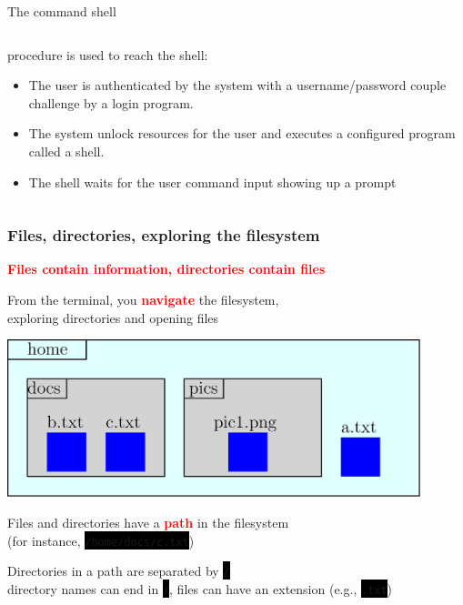 \documentclass[unknownkeysallowed, 10pt, a4 paper, handout]{beamer}
\newcommand{\focus}[1]{\textbf{\textcolor{red}{#1}}}
\newcommand{\code}[1]{\colorbox{black}{\color{green}\texttt{#1}}}
\begin{document}
\begin{frame}[label=shell]{The command shell}
\begin{columns}[T]
\begin{column}{.46\textwidth}
{      procedure is used to reach the shell:
      \begin{itemize}
        \item The user is authenticated by the system with a username/password
          couple challenge by a login program.
        \item The system unlock resources for the user and executes a
          configured program called a shell.
        \item The shell waits for the user command input showing up a prompt 
      \end{itemize}
      }
    \end{column}
  \end{columns}
\end{frame}




\begin{frame}[c]
  \begin{center}
    \frametitle{Files, directories, exploring the filesystem}

    \focus{Files contain information, directories contain files}

    From the terminal, you \focus{navigate} the filesystem,\\
    exploring directories and opening files
    \vspace{-3mm}

    \begin{center}
      \includegraphics[width=0.90\textwidth]{pics/filesystem.eps}
    \end{center}
    \vspace{-3mm}

    Files and directories have a \focus{path} in the filesystem\\
    (for instance, \code{/home/docs/c.txt})

    Directories in a path are separated by \code{/}\\
    directory names can end in \code{/}, files can have an extension (e.g., \code{.txt})

  \end{center}
\end{frame}
\end{document}
